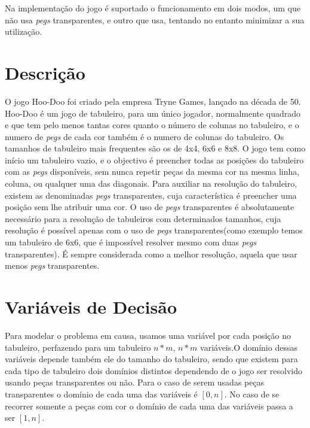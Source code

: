 \documentclass{llncs}
\begin{document}
Na implementa\c{c}\~{a}o do jogo \'{e} suportado o funcionamento em dois modos, um que n\~{a}o usa \emph{pegs} transparentes, e outro que usa, tentando no entanto minimizar a sua utiliza\c{c}\~{a}o.

%

\section{Descri\c{c}\~{a}o}
%
O jogo Hoo-Doo foi criado pela empresa Tryne Games, lan\c{c}ado na d\'{e}cada de 50. Hoo-Doo \'{e} um jogo de tabuleiro, para um \'{u}nico jogador, normalmente quadrado e que tem pelo menos tantas cores quanto o n\'{u}mero de colunas no tabuleiro, e o numero de \emph{\emph{pegs}} de cada cor tamb\'{e}m \'{e} o numero de colunas do tabuleiro. Os tamanhos de tabuleiro mais frequentes s\~{a}o os de 4x4, 6x6 e 8x8. O jogo tem como in\'{i}cio um tabuleiro vazio, e o objectivo \'{e} preencher todas as posi\c{c}\~{o}es do tabuleiro com as \emph{pegs} dispon\'{i}veis, sem nunca repetir pe\c{c}as da mesma cor na mesma linha, coluna, ou qualquer uma das diagonais. Para auxiliar na resolu\c{c}\~{a}o do tabuleiro, existem as denominadas \emph{pegs} transparentes, cuja caracter\'{i}stica \'{e} preencher uma posi\c{c}\~{a}o sem lhe atribuir uma cor. O uso de \emph{pegs} transparentes \'{e} absolutamente necess\'{a}rio para a resolu\c{c}\~{a}o de tabuleiros com determinados tamanhos, cuja resolu\c{c}\~{a}o \'{e} poss\'{i}vel apenas com o uso de \emph{pegs} transparentes(como exemplo temos um tabuleiro de 6x6, que \'{e} imposs\'{i}vel resolver mesmo com duas \emph{pegs} transparentes). \'{E} sempre considerada como a melhor resolu\c{c}\~{a}o, aquela que usar menos \emph{pegs} transparentes.






\section{Vari\'{a}veis de Decis\~{a}o}

Para modelar o problema em causa, usamos uma vari\'{a}vel por cada posi\c{c}\~{a}o no tabuleiro, perfazendo para um tabuleiro $n * m$, $n * m$ vari\'{a}veis.O dom\'{i}nio dessas vari\'{a}veis depende tamb\'{e}m ele do tamanho do tabuleiro, sendo que existem para cada tipo de tabuleiro dois dom\'{i}nios distintos dependendo de o jogo ser resolvido usando pe\c{c}as transparentes ou n\~{a}o.
Para o caso de serem usadas pe\c{c}as transparentes o dom\'{i}nio de cada uma das vari\'{a}veis \'{e} $[0,n]$.
No caso de se recorrer somente a pe\c{c}as com cor o dom\'{i}nio de cada uma das vari\'{a}veis passa a ser $[1,n]$.
\end{document}
